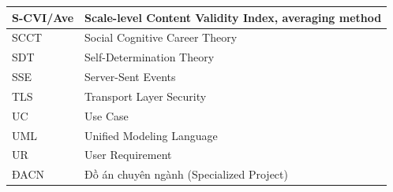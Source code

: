 {\begin{longtable}{|>{\raggedright\arraybackslash}p{}|>{\raggedright\arraybackslash}p{}|}
S-CVI/Ave & Scale-level Content Validity Index, averaging method \\ \hline
SCCT & Social Cognitive Career Theory \\ \hline
SDT & Self-Determination Theory \\ \hline
SSE & Server-Sent Events \\ \hline
TLS & Transport Layer Security \\ \hline
UC & Use Case \\ \hline
UML & Unified Modeling Language \\ \hline
UR & User Requirement \\ \hline
ĐACN & Đồ án chuyên ngành (Specialized Project) \\ \hline
\end{longtable}
}

